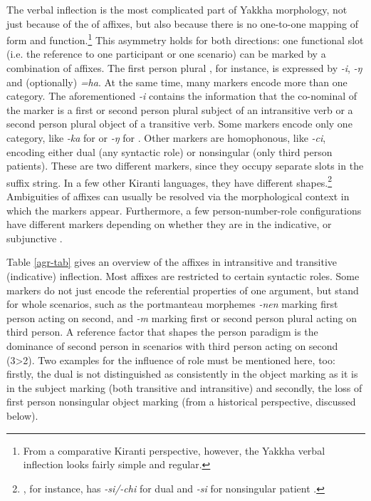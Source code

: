 The verbal inflection is the most complicated part of Yakkha morphology, not just because of the  of affixes, but also because there is no one-to-one mapping of form and function.\footnote{From a comparative Kiranti perspective, however, the Yakkha verbal inflection looks fairly simple and regular.} This asymmetry holds for both directions: one functional slot (i.e. the reference to one participant or one scenario) can be marked by a combination of affixes. The first person plural , for instance, is expressed by \emph{-i}, \emph{-ŋ} and (optionally) \emph{=ha}. At the same time, many markers  encode more than one category. The aforementioned \emph{-i} contains the information that the co-nominal of the marker is a first or second person plural subject of an intransitive verb or a second person plural object of a transitive verb.  Some markers encode only one category, like \emph{-ka} for  or \emph{-ŋ} for . Other markers are homophonous, like \emph{-ci}, encoding either dual (any syntactic role) or nonsingular (only third person patients). These are two different markers, since they occupy separate slots in the suffix string. In a few other Kiranti languages, they have different shapes.\footnote{, for instance, has \emph{-si/-chi} for dual and \emph{-si} for nonsingular patient \citep[75]{Driem1987A-grammar}.} Ambiguities of affixes can  usually be resolved via the morphological context in which the markers appear. Furthermore,  a few person-number-role configurations have different markers depending on whether they are in the indicative,  or subjunctive . 


Table \ref{agr-tab} gives an overview of the  affixes in intransitive and transitive (indicative) inflection. Most affixes are restricted to certain syntactic roles. Some markers do not just encode the referential properties  of one argument, but stand for whole scenarios, such as the portmanteau morphemes \emph{-nen} marking first person acting on second, and \emph{-m} marking first or second person plural acting on third person. A reference factor that shapes the person paradigm is the dominance of second person in scenarios with third person acting on second (3>2). Two examples for the influence of role must be mentioned here, too: firstly, the dual is not distinguished as consistently in the object marking as it is in the subject marking (both transitive and intransitive) and secondly, the loss of first person nonsingular object marking (from a historical perspective, discussed below). 



